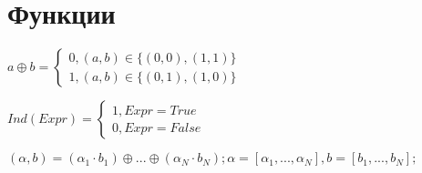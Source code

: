 \documentclass[utf8x, 14pt]{G7-32} %
\begin{document}
\section{Функции}
$
a \oplus b = \begin{cases}
0, (a,b) \in \{(0,0), (1,1)\} \\
1, (a,b) \in \{(0,1), (1,0)\}
\end{cases}
$


$  
Ind (Expr) = 
\begin{cases} 1, Expr = True\\
0, Expr = False
\end{cases}
$ 


$
(\alpha, b) = (\alpha_1 \cdot b_1) \oplus ... \oplus (\alpha_N \cdot b_N); \alpha = [\alpha_1, ..., \alpha_N], b = [b_1, ..., b_N];
$



\mainmatter %






\end{document}
